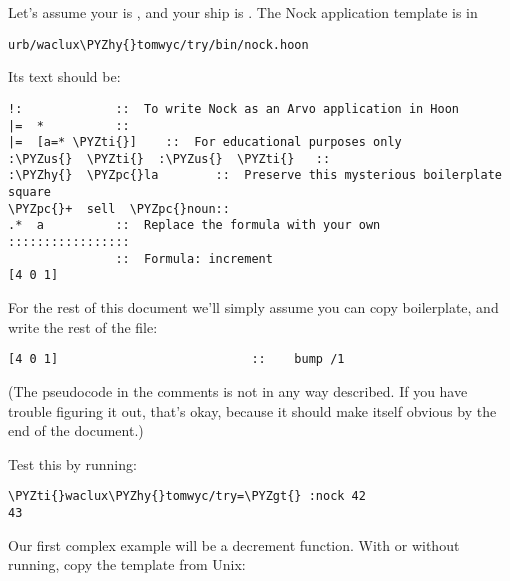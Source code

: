 Let's assume your  is , and your ship is
.  The Nock application template is in

\begin{framed_shaded}
\begin{Verbatim}[fontsize=\relsize{-2.5},fontseries=b,commandchars=\\\{\}]
urb/waclux\PYZhy{}tomwyc/try/bin/nock.hoon
\end{Verbatim}
\end{framed_shaded}
Its text should be:

\begin{framed_shaded}
\begin{Verbatim}[fontsize=\relsize{-2.5},fontseries=b,commandchars=\\\{\}]
!:             ::  To write Nock as an Arvo application in Hoon
|=  *          ::
|=  [a=* \PYZti{}]    ::  For educational purposes only
:\PYZus{}  \PYZti{}  :\PYZus{}  \PYZti{}   ::
:\PYZhy{}  \PYZpc{}la        ::  Preserve this mysterious boilerplate square
\PYZpc{}+  sell  \PYZpc{}noun::
.*  a          ::  Replace the formula with your own
:::::::::::::::::
               ::  Formula: increment
[4 0 1]
\end{Verbatim}
\end{framed_shaded}
For the rest of this document we'll simply assume you can copy
boilerplate, and write the rest of the file:

\begin{framed_shaded}
\begin{Verbatim}[fontsize=\relsize{-2.5},fontseries=b,commandchars=\\\{\}]
[4 0 1]                           ::    bump /1
\end{Verbatim}
\end{framed_shaded}
(The pseudocode in the comments is not in any way described.  If
you have trouble figuring it out, that's okay, because it should
make itself obvious by the end of the document.)

Test this by running:

\begin{framed_shaded}
\begin{Verbatim}[fontsize=\relsize{-2.5},fontseries=b,commandchars=\\\{\}]
\PYZti{}waclux\PYZhy{}tomwyc/try=\PYZgt{} :nock 42
43
\end{Verbatim}
\end{framed_shaded}
Our first complex example will be a decrement function.  With or
without  running, copy the template from Unix:

